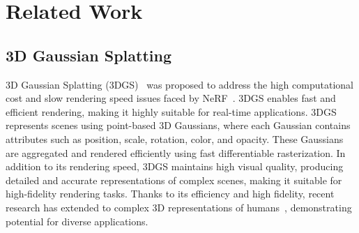 \section{Related Work}
\label{sec:related_work}
\subsection{3D Gaussian Splatting}
3D Gaussian Splatting (3DGS)~\cite{kerbl20233d} was proposed to address the high computational cost and slow rendering speed issues faced by NeRF~\cite{mildenhall2021nerf}. 3DGS enables fast and efficient rendering, making it highly suitable for real-time applications. 3DGS represents scenes using point-based 3D Gaussians, where each Gaussian contains attributes such as position, scale, rotation, color, and opacity. These Gaussians are aggregated and rendered efficiently using fast differentiable rasterization. In addition to its rendering speed, 3DGS maintains high visual quality, producing detailed and accurate representations of complex scenes, making it suitable for high-fidelity rendering tasks. Thanks to its efficiency and high fidelity, recent research has extended to complex 3D representations of humans~\cite{pang2024ash,jiang2024hifi4g,moon2024exavatar,zhou2024hugs,hu2024gauhuman,pokhariya2024manus,li2024talkinggaussian}, demonstrating potential for diverse applications.

